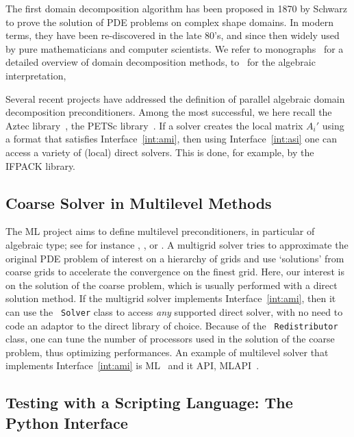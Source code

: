 \documentclass[acmtocl]{acmtrans2m}
\begin{document}
The first domain decomposition algorithm has been proposed in 1870 by Schwarz
to prove the solution of PDE problems on complex shape domains. In modern
terms, they have been re-discovered in the late 80's, and since then widely
used by pure mathematicians and computer scientists. We refer to
monographs~\cite{QV2,smith96parallel} for a detailed
overview of domain decomposition methods, to~\cite{saad96iterative} for the
algebraic interpretation,
  
\smallskip

Several recent projects have addressed the definition of parallel algebraic
domain decomposition preconditioners. Among the most successful, we here
recall the Aztec library~\cite{Aztec}, the PETSc library~\cite{petsc-guide}.
If a solver creates the local matrix $A_i'$ using a format that satisfies
Interface~\ref{int:ami}, then using Interface~\ref{int:asi} one can access a
variety of (local) direct solvers. This is done, for example, by the IFPACK library.

\subsection{Coarse Solver in Multilevel Methods}
\label{sec:ml}

The ML project aims to define multilevel preconditioners, in particular of
algebraic type; see for instance \cite{brandt.classic}, \cite{hack.book}, or
\cite{hack2.book}.
A multigrid solver tries to approximate
the original PDE problem of interest on a hierarchy of grids and use
`solutions' from coarse grids to accelerate the convergence
on the finest grid.  
Here, our interest is on the solution of the coarse
problem, which is usually performed with a direct solution method. If the
multigrid solver implements Interface~\ref{int:ami}, then it can use the {\tt
Solver} class to access {\sl any} supported direct solver, with no need to
code an adaptor to the direct library of choice. Because of the {\tt
Redistributor} class, one can tune the number of processors used in the
solution of the coarse problem, thus optimizing performances. An example of
multilevel solver that implements Interface~\ref{int:ami} is
ML~\cite{ml-guide} and it API, MLAPI~\cite{sala05object}.

\subsection{Testing with a Scripting Language: The Python Interface}
\label{sec:pytrilinos}
\end{document}
